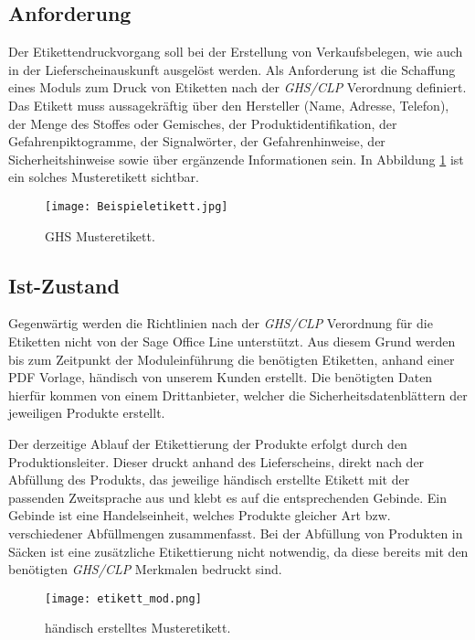 \subsection{Anforderung}

Der Etikettendruckvorgang soll bei der Erstellung von Verkaufsbelegen, 
wie auch in der Lieferscheinauskunft ausgelöst werden. Als 
Anforderung ist die Schaffung eines Moduls zum Druck von Etiketten nach 
der \emph{GHS/CLP} Verordnung definiert. Das Etikett muss aussagekräftig
über den Hersteller (Name, Adresse, Telefon), der Menge des Stoffes oder 
Gemisches, der Produktidentifikation, der Gefahrenpiktogramme, der 
Signalwörter, der Gefahrenhinweise, der Sicherheitshinweise sowie über 
ergänzende Informationen sein. In Abbildung 
\ref{fig:musteretikett} ist ein solches Musteretikett sichtbar.

\begin{figure}[H]
    \centering
    \texttt{[image: Beispieletikett.jpg]}
    \caption[GHS Musteretikett]{\small{GHS Musteretikett. \cite{bgwetikett}}}
    \label{fig:musteretikett}
\end{figure}

\subsection{Ist-Zustand}

Gegenwärtig werden die Richtlinien nach der \emph{GHS/CLP} Verordnung für die 
Etiketten nicht von der Sage Office Line unterstützt. Aus diesem Grund werden 
bis zum Zeitpunkt der Moduleinführung die benötigten Etiketten, anhand einer PDF 
Vorlage, händisch von unserem Kunden erstellt. Die benötigten Daten hierfür 
kommen von einem Drittanbieter, welcher die Sicherheitsdatenblättern der 
jeweiligen Produkte erstellt. 

\noindent
Der derzeitige Ablauf der Etikettierung der Produkte erfolgt durch den 
Produktionsleiter. Dieser druckt anhand des Lieferscheins, 
direkt nach der Abfüllung des Produkts, das jeweilige händisch erstellte
Etikett mit der passenden Zweitsprache aus und klebt es auf die entsprechenden
Gebinde. Ein Gebinde ist eine Handelseinheit, welches Produkte gleicher Art bzw.
verschiedener Abfüllmengen zusammenfasst.\cite{gebinde} 
Bei der Abfüllung von Produkten in Säcken ist eine zusätzliche Etikettierung nicht notwendig, 
da diese bereits mit den benötigten \emph{GHS/CLP} Merkmalen bedruckt sind. \cite{fzp}

\begin{figure}[H]
    \centering
    \texttt{[image: etikett\_mod.png]}
    \caption[händisch erstelltes Musteretikett]{\small{händisch erstelltes Musteretikett. \cite{fzp}}}
    \label{fig:hemusteretikett}
\end{figure}

